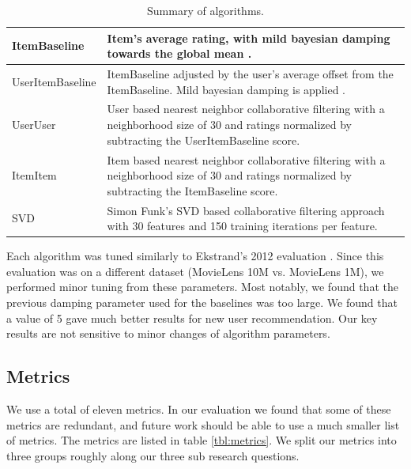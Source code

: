\documentclass[letterpaper]{sig-alternate}
\begin{document}
  \begin{table}[ht!]
    \centering
    \begin{tabular}{|p{6em}|p{18em}|}
      \hline
      ItemBaseline       & Item's average rating, with mild bayesian damping towards the global mean \cite{funk_netflix_2006}. \\\hline
      UserItem\-Baseline & ItemBaseline adjusted by the user's average offset from the ItemBaseline. Mild bayesian damping is applied \cite{funk_netflix_2006}. \\\hline
      UserUser           & User based nearest neighbor collaborative filtering \cite{resnick1994grouplens} with a neighborhood size of 30 and ratings normalized by subtracting the UserItemBaseline score. \\\hline
      ItemItem           & Item based nearest neighbor collaborative filtering \cite{sarwar2001item} with a neighborhood size of 30 and ratings normalized by subtracting the ItemBaseline score.   \\\hline
      SVD                & Simon Funk's SVD based collaborative filtering approach \cite{funk_netflix_2006} with 30 features and 150 training iterations per feature. \\\hline
    \end{tabular}
    \caption{Summary of algorithms.}
    \label{tbl:algo}
  \end{table}
  
  Each algorithm was tuned similarly to Ekstrand's 2012 evaluation \cite{ekstrand2012recommenders}.
  Since this evaluation was on a different dataset (MovieLens 10M vs. MovieLens 1M), we performed minor tuning from these parameters.
  Most notably, we found that the previous damping parameter used for the baselines was too large.
  We found that a value of 5 gave much better results for new user recommendation.
  Our key results are not sensitive to minor changes of algorithm parameters.


  \subsection*{Metrics}

  We use a total of eleven metrics.
  In our evaluation we found that some of these metrics are redundant, and future work should be able to use a much smaller list of metrics.
  The metrics are listed in table \ref{tbl:metrics}.
  We split our metrics into three groups roughly along our three sub research questions.
\end{document}
